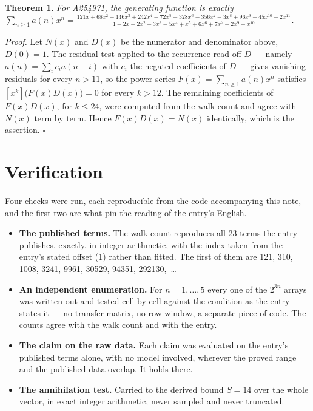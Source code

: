 \documentclass[11pt]{article}
\newtheorem{theorem}{Theorem}
\theoremstyle{definition}
\begin{document}
\begin{theorem} For A254971, the generating function is exactly $\sum_{n\ge 1} a(n)x^n = \frac{121x + 68x^{2} + 146x^{3} + 242x^{4} - 72x^{5} - 328x^{6} - 356x^{7} - 3x^{8} + 96x^{9} - 45x^{10} - 2x^{11}}{1 - 2x - 2x^{2} - 3x^{3} - 5x^{4} + x^{5} + 6x^{6} + 7x^{7} - 2x^{9} + x^{10}}$.\end{theorem}

{\itshape Proof.} Let $N(x)$ and $D(x)$ be the numerator and denominator above, $D(0)=1$. The residual test applied to the recurrence read off $D$ --- namely $a(n) = \sum_i c_i a(n-i)$ with $c_i$ the negated coefficients of $D$ --- gives vanishing residuals for every $n > 11$, so the power series $F(x)=\sum_{n\ge 1}a(n)x^n$ satisfies $[x^k]\bigl(F(x)D(x)\bigr) = 0$ for every $k > 12$. The remaining coefficients of $F(x)D(x)$, for $k \le 24$, were computed from the walk count and agree with $N(x)$ term by term. Hence $F(x)D(x) = N(x)$ identically, which is the assertion. $\square$

\section{Verification}

Four checks were run, each reproducible from the code accompanying this note, and the first two are what pin the reading of the entry's English.

\begin{itemize}

\item {\bfseries The published terms.} The walk count reproduces all 23 terms the entry publishes, exactly, in integer arithmetic, with the index taken from the entry's stated offset (1) rather than fitted. The first of them are 121, 310, 1008, 3241, 9961, 30529, 94351, 292130,~\dots

\item {\bfseries An independent enumeration.} For $n = 1,\dots,5$ every one of the $2^{3n}$ arrays was written out and tested cell by cell against the condition as the entry states it --- no transfer matrix, no row window, a separate piece of code. The counts agree with the walk count and with the entry.

\item {\bfseries The claim on the raw data.} Each claim was evaluated on the entry's published terms alone, with no model involved, wherever the proved range and the published data overlap. It holds there.

\item {\bfseries The annihilation test.} Carried to the derived bound $S = 14$ over the whole vector, in exact integer arithmetic, never sampled and never truncated.

\end{itemize}
\end{document}
